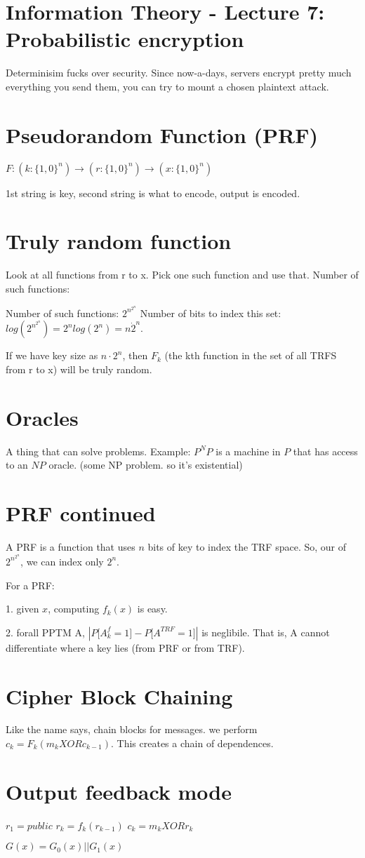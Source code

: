 \section{Information Theory - Lecture 7: Probabilistic encryption}

Determinisim fucks over security. Since now-a-days, servers encrypt pretty much everything you send them,
you can try to mount a chosen plaintext attack.

\section{Pseudorandom Function (PRF)}

$F: (k: \{1, 0\}^n) \to (r : \{1, 0\}^n) \to (x: \{1, 0\}^n)$

1st string is key, second string is what to encode, output is encoded.

\section{Truly random function}
Look at all functions from r to x. Pick one such function and use that. Number of such functions:

Number of such functions: $2^{n^{2^n}}$
Number of bits to index this set: $log (2^{n^{2^n}}) = 2^n log(2^n) = n \dot 2^n$.


If we have key size as $n \cdot 2^n$, then $F_k$ (the kth function in the set of all TRFS from r to x) will be truly random.


\section{Oracles}

A thing that can solve problems. Example: $P^NP$ is a machine in $P$ that has access to an $NP$ oracle. (some NP problem. so it's existential)


\section{PRF continued}
A PRF is a function that uses $n$ bits of key to index the TRF space. So, our of $2^{n^{2^n}}$, we can index only $2^n$.

For a PRF:

1. given $x$, computing $f_k(x)$ is easy.

2. forall PPTM A, $|P \lbrack A^f_k = 1 \rbrack - P \lbrack A^{TRF} = 1 \rbrack|$ is neglibile. That is, A cannot differentiate where a key lies (from PRF or from TRF).

\section{Cipher Block Chaining}

Like the name says, chain blocks for messages. we perform $c_k = F_k(m_k XOR c_{k - 1})$. This creates a chain of dependences.

\section{Output feedback mode}
$r_1 = public$
$r_k = f_k(r_{k - 1})$
$c_k = m_k XOR r_k$


$G(x) = G_0(x) || G_1(x)$






